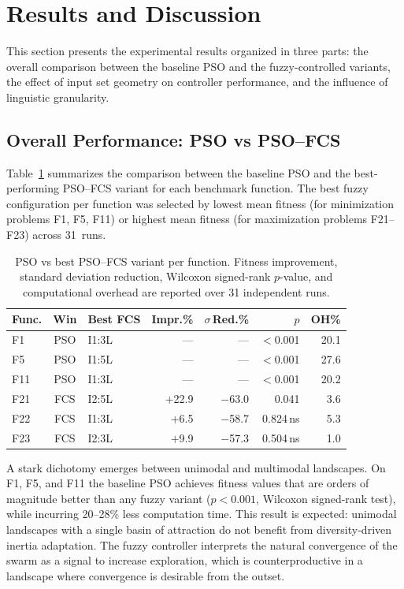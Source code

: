\section{Results and Discussion}
\label{sec:results}

This section presents the experimental results organized in three parts: the overall comparison between the baseline PSO and the fuzzy-controlled variants, the effect of input set geometry on controller performance, and the influence of linguistic granularity.

\subsection{Overall Performance: PSO vs PSO--FCS}
\label{subsec:overall_results}

Table~\ref{tab:pso_vs_fcs} summarizes the comparison between the baseline PSO and the best-performing PSO--FCS variant for each benchmark function. The best fuzzy configuration per function was selected by lowest mean fitness (for minimization problems F1, F5, F11) or highest mean fitness (for maximization problems F21--F23) across 31~runs.

\begin{table}[h]
    \caption{PSO vs best PSO--FCS variant per function. Fitness improvement, standard deviation reduction, Wilcoxon signed-rank $p$-value, and computational overhead are reported over 31 independent runs.}
    \label{tab:pso_vs_fcs}
    \centering
    \footnotesize
    \begin{tabular}{@{}lclrrrr@{}}
    \toprule
    Func. & Win & Best FCS & Impr.\% & $\sigma$\,Red.\% & $p$ & OH\% \\
    \midrule
    F1  & PSO & I1:3L & --- & --- & $<$0.001\rlap{***} & 20.1 \\
    F5  & PSO & I1:5L & --- & --- & $<$0.001\rlap{***} & 27.6 \\
    F11 & PSO & I1:3L & --- & --- & $<$0.001\rlap{***} & 20.2 \\
    F21 & FCS & I2:5L & $+$22.9 & $-$63.0 & 0.041\rlap{*} & 3.6 \\
    F22 & FCS & I1:3L & $+$6.5  & $-$58.7 & 0.824\,ns & 5.3 \\
    F23 & FCS & I2:3L & $+$9.9  & $-$57.3 & 0.504\,ns & 1.0 \\
    \bottomrule
    \end{tabular}
\end{table}

A stark dichotomy emerges between unimodal and multimodal landscapes. On F1, F5, and F11 the baseline PSO achieves fitness values that are orders of magnitude better than any fuzzy variant ($p < 0.001$, Wilcoxon signed-rank test), while incurring 20--28\% less computation time. This result is expected: unimodal landscapes with a single basin of attraction do not benefit from diversity-driven inertia adaptation. The fuzzy controller interprets the natural convergence of the swarm as a signal to increase exploration, which is counterproductive in a landscape where convergence is desirable from the outset.


